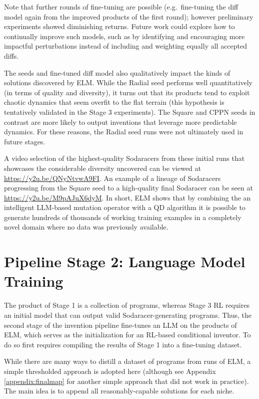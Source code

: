 \documentclass{article}
\begin{document}
Note that further rounds of fine-tuning are possible (e.g.\ fine-tuning the diff model again from the improved products of the first round); however preliminary experiments showed diminishing returns. Future work could explore how to continually improve such models, such as by identifying and encouraging more impactful perturbations instead of including and weighting equally all accepted diffs. 

The seeds and fine-tuned diff model also qualitatively impact the kinds of solutions discovered by ELM. While the Radial seed performs well quantitatively (in terms of quality and diversity), it turns out that its products tend to exploit chaotic dynamics that seem overfit to the flat terrain (this hypothesis is tentatively validated in the Stage 3 experiments). The Square and CPPN seeds in contrast are more likely to output inventions that leverage more predictable dynamics. 
For these reasons, the Radial seed runs were not ultimately used in future stages.

A video selection of the highest-quality Sodaracers from these initial runs
that showcases the considerable diversity uncovered
can be viewed at \url{https://y2u.be/QNyNtvwA9FI}. 
An example of a lineage of Sodaracers progressing from the Square seed to a high-quality final Sodaracer can be seen at \url{https://y2u.be/M9pAJuX6dyM}.
In short, ELM shows that by combining the an intelligent LLM-based mutation operator with a QD algorithm it is possible to generate hundreds of thousands of working training examples in a completely novel domain where no data was previously available.







\section{Pipeline Stage 2: Language Model Training}
\label{sec:pipeline-stage-2}

The product of Stage 1 is a collection of programs, whereas Stage 3 RL requires an initial model that can output valid Sodaracer-generating programs. Thus, the second stage of the invention pipeline fine-tunes an LLM on the products of ELM, which serves as the initialization for an RL-based conditional inventor. To do so first requires compiling the results of Stage 1 into a fine-tuning dataset.

While there are many ways to distill a dataset of programs from runs of ELM, a simple thresholded approach is adopted here (although see Appendix \ref{appendix:finalmap} for another simple approach that did not work in practice). The main idea is to append all reasonably-capable solutions for each niche.
\end{document}
